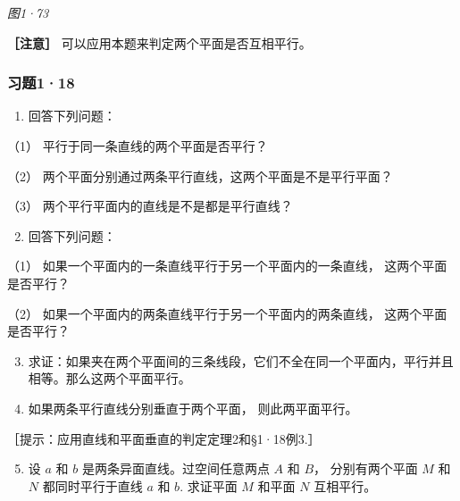 \emph{图1·73}

\textbf{［注意］} 可以应用本题来判定两个平面是否互相平行。

\subsubsection{习题1·18}

\begin{enumerate}
\item
  回答下列问题：
\end{enumerate}

（1） 平行于同一条直线的两个平面是否平行？

（2） 两个平面分别通过两条平行直线，这两个平面是不是平行平面？

（3） 两个平行平面内的直线是不是都是平行直线？

\begin{enumerate}
\setcounter{enumi}{1}
\item
  回答下列问题：
\end{enumerate}

（1） 如果一个平面内的一条直线平行于另一个平面内的一条直线，
这两个平面是否平行？

（2） 如果一个平面内的两条直线平行于另一个平面内的两条直线，
这两个平面是否平行？

\begin{enumerate}
\setcounter{enumi}{2}
\item
  求证：如果夹在两个平面间的三条线段，它们不全在同一个平面内，平行并且相等。那么这两个平面平行。
\item
  如果两条平行直线分别垂直于两个平面， 则此两平面平行。
\end{enumerate}

［提示：应用直线和平面垂直的判定定理2和§1·18例3.］

\begin{enumerate}
\setcounter{enumi}{4}
\item
  设 \(a\) 和 \(b\) 是两条异面直线。过空间任意两点 \(A\) 和 \(B\)，
  分别有两个平面 \(M\) 和 \(N\) 都同时平行于直线 \(a\) 和 \(b\).
  求证平面 \(M\) 和平面 \(N\) 互相平行。
\end{enumerate}

